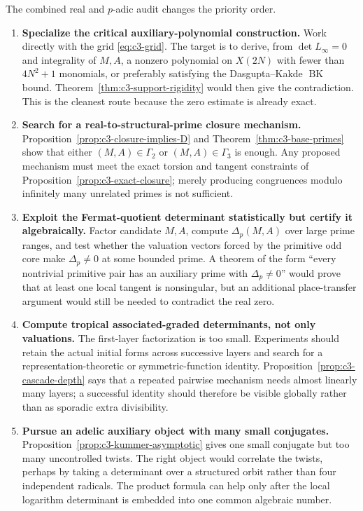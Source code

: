 \documentclass[11pt,oneside]{article}
\theoremstyle{definition}
\theoremstyle{remark}
\begin{document}
The combined real and $p$-adic audit changes the priority order.

\begin{enumerate}
\item \textbf{Specialize the critical auxiliary-polynomial construction.}
      Work directly with the grid \eqref{eq:c3-grid}.  The target is to derive, from
      $\det L_\infty=0$ and integrality of $M,A$, a nonzero polynomial on $X(2N)$ with fewer
      than $4N^2+1$ monomials, or preferably satisfying the Dasgupta--Kakde
      $\operatorname{BK}$ bound.  Theorem~\ref{thm:c3-support-rigidity} would then give the
      contradiction.  This is the cleanest route because the zero estimate is already exact.

\item \textbf{Search for a real-to-structural-prime closure mechanism.}
      Proposition~\ref{prop:c3-closure-implies-D} and
      Theorem~\ref{thm:c3-base-primes} show that either
      $(M,A)\in\Gamma_2$ or $(M,A)\in\Gamma_3$ is enough.  Any proposed mechanism must meet
      the exact torsion and tangent constraints of Proposition~\ref{prop:c3-exact-closure};
      merely producing congruences modulo infinitely many unrelated primes is not sufficient.

\item \textbf{Exploit the Fermat-quotient determinant statistically but certify it
      algebraically.}
      Factor candidate $M,A$, compute $\Delta_p(M,A)$ over large prime ranges, and test
      whether the valuation vectors forced by the primitive odd core make
      $\Delta_p\ne0$ at some bounded prime.  A theorem of the form
      ``every nontrivial primitive pair has an auxiliary prime with $\Delta_p\ne0$'' would
      prove that at least one local tangent is nonsingular, but an additional place-transfer
      argument would still be needed to contradict the real zero.

\item \textbf{Compute tropical associated-graded determinants, not only valuations.}
      The first-layer factorization is too small.  Experiments should retain the actual
      initial forms across successive layers and search for a representation-theoretic or
      symmetric-function identity.  Proposition~\ref{prop:c3-cascade-depth} says that a
      repeated pairwise mechanism needs almost linearly many layers; a successful identity
      should therefore be visible globally rather than as sporadic extra divisibility.

\item \textbf{Pursue an adelic auxiliary object with many small conjugates.}
      Proposition~\ref{prop:c3-kummer-asymptotic} gives one small conjugate but too many
      uncontrolled twists.  The right object would correlate the twists, perhaps by taking a
      determinant over a structured orbit rather than four independent radicals.  The product
      formula can help only after the local logarithm determinant is embedded into one common
      algebraic number.


\end{enumerate}
\end{document}

